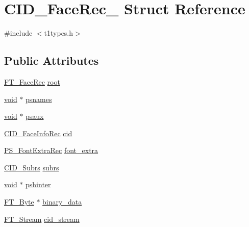 \hypertarget{struct_c_i_d___face_rec__}{\section{C\-I\-D\-\_\-\-Face\-Rec\-\_\- Struct Reference}
\label{struct_c_i_d___face_rec__}
}


{\ttfamily \#include $<$t1types.\-h$>$}

\subsection*{Public Attributes}
\begin{DoxyCompactItemize}
\item 
\hyperlink{freetype_8h_a530156fe5441077746e672987881526c}{F\-T\-\_\-\-Face\-Rec} \hyperlink{struct_c_i_d___face_rec___aeeb09d3feaa016b664e1c5bf95a6f232}{root}
\item 
\hyperlink{wglew_8h_aeea6e3dfae3acf232096f57d2d57f084}{void} $\ast$ \hyperlink{struct_c_i_d___face_rec___ab87e41e70c9aa0c32382ce43dda8b32a}{psnames}
\item 
\hyperlink{wglew_8h_aeea6e3dfae3acf232096f57d2d57f084}{void} $\ast$ \hyperlink{struct_c_i_d___face_rec___a8e8c0efc67577803cef0f73fc114470d}{psaux}
\item 
\hyperlink{t1tables_8h_a07baf84bf864273ed2f13e73202d1a2d}{C\-I\-D\-\_\-\-Face\-Info\-Rec} \hyperlink{struct_c_i_d___face_rec___a00bc02f259a47704eb471d38c573bd4c}{cid}
\item 
\hyperlink{t1types_8h_a14c3e20968f7f84b12c23acc9a54472d}{P\-S\-\_\-\-Font\-Extra\-Rec} \hyperlink{struct_c_i_d___face_rec___aba208398d42242870890625f993caa81}{font\-\_\-extra}
\item 
\hyperlink{t1types_8h_ade790be314badd510147c027e8b437d0}{C\-I\-D\-\_\-\-Subrs} \hyperlink{struct_c_i_d___face_rec___aa842e3eb5a5092dd0fc2c0ecf7bd692b}{subrs}
\item 
\hyperlink{wglew_8h_aeea6e3dfae3acf232096f57d2d57f084}{void} $\ast$ \hyperlink{struct_c_i_d___face_rec___a8a367e497f72f4d0384103952d73fc08}{pshinter}
\item 
\hyperlink{fttypes_8h_a51f26183ca0c9f4af958939648caeccd}{F\-T\-\_\-\-Byte} $\ast$ \hyperlink{struct_c_i_d___face_rec___a42f458adc70ad63807dbe63b8b694da2}{binary\-\_\-data}
\item 
\hyperlink{ftsystem_8h_a788b32c932932f7411a8dfa7f6c794bf}{F\-T\-\_\-\-Stream} \hyperlink{struct_c_i_d___face_rec___a2be5991aa14a8f599c02b1cdfc547e25}{cid\-\_\-stream}
\end{DoxyCompactItemize}


